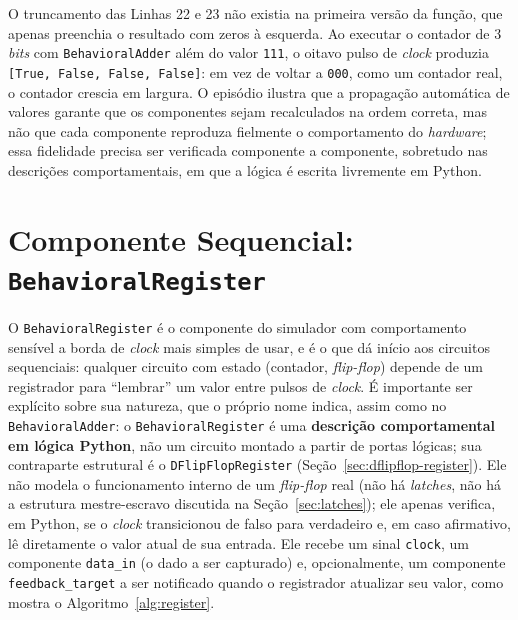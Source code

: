 O truncamento das Linhas 22 e 23 não existia na primeira versão da função, que apenas preenchia o resultado com zeros à esquerda. Ao executar o contador de 3 \textit{bits} com \texttt{BehavioralAdder} além do valor \texttt{111}, o oitavo pulso de \textit{clock} produzia \texttt{[True, False, False, False]}: em vez de voltar a \texttt{000}, como um contador real, o contador crescia em largura. O episódio ilustra que a propagação automática de valores garante que os componentes sejam recalculados na ordem correta, mas não que cada componente reproduza fielmente o comportamento do \textit{hardware}; essa fidelidade precisa ser verificada componente a componente, sobretudo nas descrições comportamentais, em que a lógica é escrita livremente em Python.

\section{Componente Sequencial: \texttt{BehavioralRegister}}
\label{sec:register}

O \texttt{BehavioralRegister} é o componente do simulador com comportamento sensível a borda de \textit{clock} mais simples de usar, e é o que dá início aos circuitos sequenciais: qualquer circuito com estado (contador, \textit{flip-flop}) depende de um registrador para ``lembrar'' um valor entre pulsos de \textit{clock}. É importante ser explícito sobre sua natureza, que o próprio nome indica, assim como no \texttt{BehavioralAdder}: o \texttt{BehavioralRegister} é uma \textbf{descrição comportamental em lógica Python}, não um circuito montado a partir de portas lógicas; sua contraparte estrutural é o \texttt{DFlipFlopRegister} (Seção~\ref{sec:dflipflop-register}). Ele não modela o funcionamento interno de um \textit{flip-flop} real (não há \textit{latches}, não há a estrutura mestre-escravo discutida na Seção~\ref{sec:latches}); ele apenas verifica, em Python, se o \textit{clock} transicionou de falso para verdadeiro e, em caso afirmativo, lê diretamente o valor atual de sua entrada. Ele recebe um sinal \texttt{clock}, um componente \texttt{data\_in} (o dado a ser capturado) e, opcionalmente, um componente \texttt{feedback\_target} a ser notificado quando o registrador atualizar seu valor, como mostra o Algoritmo~\ref{alg:register}.

